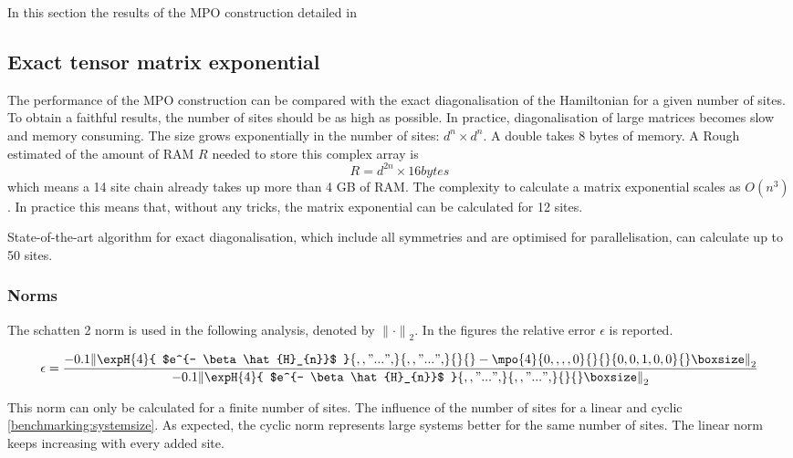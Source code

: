 In this section the results of the MPO construction detailed in

\subsection{Exact tensor matrix exponential } \label{chap_bench}

The performance of the MPO construction can be compared with the exact diagonalisation of the Hamiltonian for a given number of sites. To obtain a faithful results, the number of sites should be as high as possible. In practice, diagonalisation of large matrices becomes slow and memory consuming. The size grows exponentially in the number of sites: $d^{n} \times d^{n} $. A double takes 8 bytes of memory. A Rough estimated of the amount of RAM $R$ needed to store this complex array is
\begin{equation}
    R = d^{2 n} \times 16 bytes
\end{equation}
which means a 14 site chain already takes up more than 4 GB of RAM. The complexity to calculate a matrix exponential scales as $O(n^3)$ \cite{Moler2003}. In practice this means that, without any tricks, the matrix exponential can be calculated for 12 sites.

State-of-the-art algorithm for exact diagonalisation, which include all symmetries and are optimised for parallelisation, can calculate up to 50 sites. \cite{Wietek2018}

\subsubsection{Norms} \label{mponormdef}
\def \expHBlock {\expH{4}{ $e^{- \beta \hat{H}_{n}}$   }{ {,,"...",} }{ {,,"...",} }{}{} }
\def \Mn {\mpo{4}{ {0,,,,0}  }{}{}{{0,0,1,0,0}}{}}

The schatten 2 norm is used in the following analysis, denoted by ${\| \cdot \|} _{2}$. In the figures the relative error $\epsilon$ is reported.

\begin{equation}
    \epsilon = \frac{  {  \left \|  \expHBlock - \Mn  \right \|} _{2}  }{ {  \left\|  \expHBlock \right \|}_2}
\end{equation}

This norm can only be calculated for a finite number of sites. The influence of the number of sites for a linear  and cyclic \cref{benchmarking:systemsize}. As expected, the cyclic norm represents large systems better for the same number of sites. The linear norm keeps increasing with every added site.

